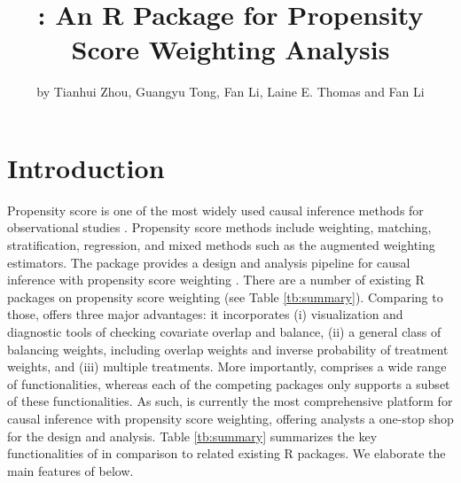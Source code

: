 \title{: An R Package for Propensity Score Weighting Analysis}
\author{by Tianhui Zhou, Guangyu Tong, Fan Li, Laine E. Thomas and Fan Li}

\maketitle



\section[Introduction]{Introduction} \label{sec:intro}

Propensity score is one of the most widely used causal inference methods for observational studies \citep{Rosenbaum1983}. Propensity score methods include weighting, matching, stratification, regression, and mixed methods such as the augmented weighting estimators. The  package provides a design and analysis pipeline for causal inference with propensity score weighting \citep{Robins1994, Hirano2003, Lunceford2004, LiMorganZaslavsky2018}. There are a number of existing R packages on propensity score weighting (see Table \ref{tb:summary}). Comparing to those,  offers three major advantages: it incorporates (i) visualization and diagnostic tools of checking covariate overlap and balance, (ii) a general class of balancing weights, including overlap weights and inverse probability of treatment weights, and  (iii) multiple treatments. More importantly,  comprises a wide range of functionalities, whereas each of the competing packages only supports a 
subset of these functionalities. 
As such,  is currently the most comprehensive platform for causal inference with propensity score weighting, offering analysts a one-stop shop for the design and analysis. Table \ref{tb:summary} summarizes the key functionalities of  in comparison to related existing R packages. We elaborate the main features of  below.    



